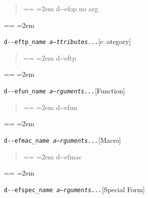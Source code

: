\documentclass{book}
\makeatletter
\newenvironment{GNUTexinfopreformatted}{%
  \par\obeylines\obeyspaces\frenchspacing
  \parskip=\z@\parindent=\z@}{}
\makeatother
\begin{document}
%
\begin{quote}
\unskip{\parskip=0pt\noindent}%
\begin{GNUTexinfopreformatted}
\leftskip=2em\relax\ttfamily%
d{-}{-}efop no arg
\end{GNUTexinfopreformatted}
\end{quote}
\begin{GNUTexinfopreformatted}
\leftskip=2em\relax\ttfamily%

\end{GNUTexinfopreformatted}
\noindent\texttt{d{-}{-}eftp\_name \EmbracOn{}\textnormal{\textsl{a--ttributes...}}\EmbracOff{}}\hfill[c--ategory]



%
\begin{quote}
\unskip{\parskip=0pt\noindent}%
\begin{GNUTexinfopreformatted}
\leftskip=2em\relax\ttfamily%
d{-}{-}eftp
\end{GNUTexinfopreformatted}
\end{quote}
\begin{GNUTexinfopreformatted}
\leftskip=2em\relax\ttfamily%

\end{GNUTexinfopreformatted}
\noindent\texttt{d{-}{-}efun\_name \EmbracOn{}\textnormal{\textsl{a--rguments...}}\EmbracOff{}}\hfill[Function]



%
\begin{quote}
\unskip{\parskip=0pt\noindent}%
\begin{GNUTexinfopreformatted}
\leftskip=2em\relax\ttfamily%
d{-}{-}efun
\end{GNUTexinfopreformatted}
\end{quote}
\begin{GNUTexinfopreformatted}
\leftskip=2em\relax\ttfamily%

\end{GNUTexinfopreformatted}
\noindent\texttt{d{-}{-}efmac\_name \EmbracOn{}\textnormal{\textsl{a--rguments...}}\EmbracOff{}}\hfill[Macro]



%
\begin{quote}
\unskip{\parskip=0pt\noindent}%
\begin{GNUTexinfopreformatted}
\leftskip=2em\relax\ttfamily%
d{-}{-}efmac
\end{GNUTexinfopreformatted}
\end{quote}
\begin{GNUTexinfopreformatted}
\leftskip=2em\relax\ttfamily%

\end{GNUTexinfopreformatted}
\noindent\texttt{d{-}{-}efspec\_name \EmbracOn{}\textnormal{\textsl{a--rguments...}}\EmbracOff{}}\hfill[Special Form]
\end{document}

